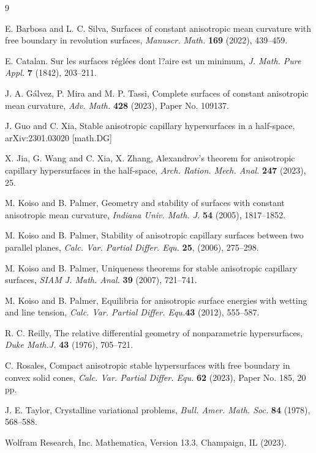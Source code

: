\documentclass[12pt,a4paper,reqno]{amsart}
\begin{document}
\begin{thebibliography}{9}

 
 
 E. Barbosa and L. C.  Silva, Surfaces of constant anisotropic mean curvature with free boundary in revolution surfaces,  \emph{Manuscr. Math.} \textbf{169} (2022), 439--459.

  E. Catalan. Sur les surfaces r\'egl\'ees dont l?aire est un minimum, \emph{J. Math. Pure Appl.} \textbf{7} (1842), 203--211.
 
 

 J. A. G\' alvez, P. Mira and    M. P. Tassi, Complete surfaces of constant anisotropic mean curvature,  \emph{Adv. Math.} \textbf{428} (2023), Paper No. 109137. 

 J. Guo and  C. Xia, Stable anisotropic capillary hypersurfaces in a half-space,   arXiv:2301.03020 [math.DG]  
 
 
 X. Jia, G. Wang and  C. Xia,   X. Zhang, Alexandrov's theorem for anisotropic capillary hypersurfaces in the half-space,  \emph{Arch. Ration. Mech. Anal.} \textbf{ 247} (2023),  25.

 M.  Koiso and  B.  Palmer, Geometry and stability of surfaces with constant anisotropic mean curvature,  \emph{Indiana Univ. Math. J.} \textbf{54} (2005),   1817--1852.


 M.  Koiso and  B.  Palmer, Stability of anisotropic capillary surfaces between two parallel planes,  \emph{Calc. Var. Partial Differ. Equ.} \textbf{25},  (2006), 275--298.


 M.  Koiso and B.  Palmer, Uniqueness theorems for stable anisotropic capillary surfaces,  \emph{SIAM J. Math. Anal.} \textbf{39} (2007), 721--741.

 

 M.  Koiso and  B.  Palmer, Equilibria for anisotropic surface energies with wetting and line tension,  \emph{Calc. Var. Partial Differ. Equ.}\textbf{43} (2012), 555--587.


 

 R. C.  Reilly,   The relative differential geometry of nonparametric hypersurfaces, \emph{Duke Math.J.} \textbf{43} (1976),  705--721.



 C. Rosales, Compact anisotropic stable hypersurfaces with free boundary in convex solid cones, 
\emph{Calc. Var. Partial Differ. Equ.} \textbf{62} (2023),  Paper No. 185, 20 pp.

 J. E. Taylor, Crystalline variational problems,  \emph{Bull. Amer. Math. Soc.} \textbf{84} (1978), 568--588. 

 Wolfram Research, Inc. Mathematica,    Version 13.3.  Champaign, IL (2023).


\end{thebibliography}
\end{document}
